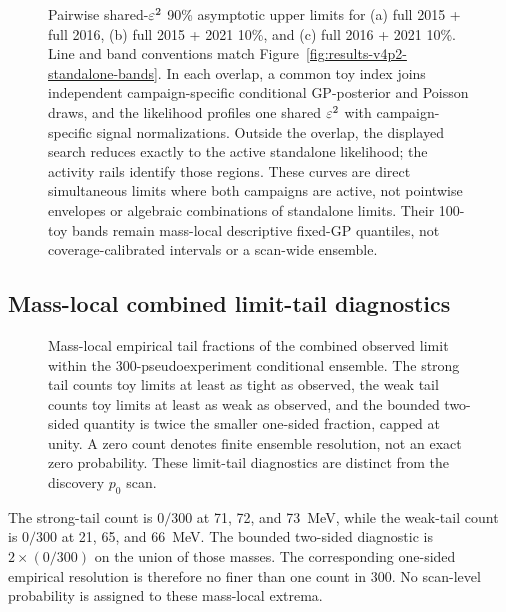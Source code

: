 \begin{figure}[H]
\centering
{}
\caption{Pairwise shared-$\varepsilon^2$ 90\% asymptotic \CLs{} upper limits for
(a) full 2015 + full 2016, (b) full 2015 + 2021 10\%, and (c) full 2016 +
2021 10\%. Line and band conventions match
Figure~\ref{fig:results-v4p2-standalone-bands}. In each overlap, a common toy
index joins independent campaign-specific conditional GP-posterior and Poisson
draws, and the likelihood profiles one shared $\varepsilon^2$ with campaign-specific
signal normalizations. Outside the overlap, the displayed search reduces
exactly to the active standalone likelihood; the activity rails identify those
regions. These curves are direct simultaneous limits where both campaigns are
active, not pointwise envelopes or algebraic combinations of standalone
limits. Their 100-toy bands remain mass-local descriptive fixed-GP quantiles,
not coverage-calibrated intervals or a scan-wide ensemble.}
\label{fig:results-v4p2-pairwise-bands}
\end{figure}

\subsection{Mass-local combined limit-tail diagnostics}
\label{sec:results-v4p2-limit-tails}

\begin{figure}[H]
\centering
{}
\caption{Mass-local empirical tail fractions of the combined observed limit
within the 300-pseudoexperiment conditional ensemble. The strong tail counts toy
limits at least as tight as observed, the weak tail counts toy limits at least as
weak as observed, and the bounded two-sided quantity is twice the smaller
one-sided fraction, capped at unity. A zero count denotes finite ensemble
resolution, not an exact zero probability. These limit-tail diagnostics are
distinct from the discovery $p_0$ scan.}
\label{fig:results-v4p2-limit-tails}
\end{figure}

The strong-tail count is $0/300$ at 71, 72, and 73~MeV, while the weak-tail
count is $0/300$ at 21, 65, and 66~MeV. The bounded two-sided diagnostic is
$2\times(0/300)$ on the union of those masses. The corresponding one-sided
empirical resolution is therefore no finer than one count in 300. No scan-level
probability is assigned to these mass-local extrema.


